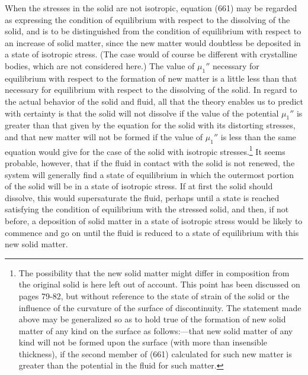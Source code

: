 \documentclass[12pt]{memoir}
\begin{document}
When the stresses in the solid are not isotropic, equation (661) may be regarded as expressing the condition of equilibrium with respect to the dissolving of the solid, and is to be distinguished from the condition of equilibrium with respect to an increase of solid matter, since the new matter would doubtless be deposited in a state of isotropic stress. (The case would of course be different with crystalline bodies, which are not considered here.) The value of $\mu_1''$ necessary for equilibrium with respect to the formation of new matter is a little less than that necessary for equilibrium with respect to the dissolving of the solid. In regard to the actual behavior of the solid and fluid, all that the theory enables us to predict with certainty is that the solid will not dissolve if the value of the potential $\mu_1''$ is greater than that given by the equation for the solid with its distorting stresses, and that new matter will not be formed if the value of $\mu_1''$ is less than the same equation would give for the case of the solid with isotropic stresses.\footnote{The possibility that the new solid matter might differ in composition from the original solid is here left out of account. This point has been discussed on pages 79-82, but without reference to the state of strain of the solid or the influence of the curvature of the surface of discontinuity. The statement made above may be generalized so as to hold true of the formation of new solid matter of any kind on the surface as follows:---that new solid matter of any kind will not be formed upon the surface (with more than insensible thickness), if the second member of (661) calculated for such new matter is greater than the potential in the fluid for such matter.} It seems probable, however, that if the fluid in contact with the solid is not renewed, the system will generally find a state of equilibrium in which the outermost portion of the solid will be in a state of isotropic stress. If at first the solid should dissolve, this would supersaturate the fluid, perhaps until a state is reached satisfying the condition of equilibrium with the stressed solid, and then, if not before, a deposition of solid matter in a state of isotropic stress would be likely to commence and go on until the fluid is reduced to a state of equilibrium with this new solid matter.
\end{document}
